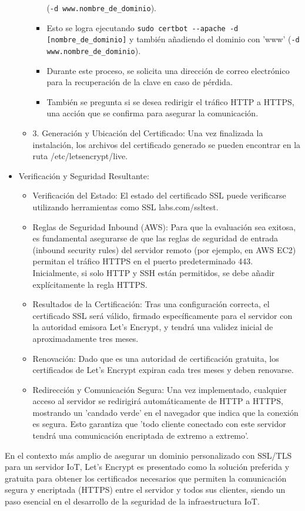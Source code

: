 \documentclass{report}
\begin{document}
\begin{itemize}
\begin{itemize}
\begin{itemize}
                    (\verb|-d www.nombre_de_dominio|).
                    \item Esto se logra ejecutando \verb|sudo certbot --apache -d [nombre_de_dominio]| y también añadiendo el dominio con 'www' 
                    (\verb|-d www.nombre_de_dominio|).
                    \item Durante este proceso, se solicita una dirección de correo electrónico para la recuperación de la clave en caso de pérdida.
                    \item También se pregunta si se desea redirigir el tráfico HTTP a HTTPS, una acción que se confirma para asegurar la comunicación.
                \end{itemize}
            \item 3. Generación y Ubicación del Certificado: Una vez finalizada la instalación, los archivos del certificado generado 
            se pueden encontrar en la ruta /etc/letsencrypt/live.
        \end{itemize}
    \item Verificación y Seguridad Resultante:
        \begin{itemize}
            \item Verificación del Estado: El estado del certificado SSL puede verificarse utilizando herramientas como SSL labs.com/ssltest.
            \item Reglas de Seguridad Inbound (AWS): Para que la evaluación sea exitosa, es fundamental asegurarse de que las reglas de 
            seguridad de entrada (inbound security rules) del servidor remoto (por ejemplo, en AWS EC2) permitan el tráfico HTTPS en el puerto 
            predeterminado 443. Inicialmente, si solo HTTP y SSH están permitidos, se debe añadir explícitamente la regla HTTPS.
            \item Resultados de la Certificación: Tras una configuración correcta, el certificado SSL será válido, firmado específicamente 
            para el servidor con la autoridad emisora Let's Encrypt, y tendrá una validez inicial de aproximadamente tres meses.
            \item Renovación: Dado que es una autoridad de certificación gratuita, los certificados de Let's Encrypt expiran cada tres meses 
            y deben renovarse.
            \item Redirección y Comunicación Segura: Una vez implementado, cualquier acceso al servidor se redirigirá automáticamente de 
            HTTP a HTTPS, mostrando un 'candado verde' en el navegador que indica que la conexión es segura. Esto garantiza que 'todo cliente 
            conectado con este servidor tendrá una comunicación encriptada de extremo a extremo'.
        \end{itemize}
\end{itemize}
En el contexto más amplio de asegurar un dominio personalizado con SSL/TLS para un servidor IoT, Let's Encrypt es presentado como 
la solución preferida y gratuita para obtener los certificados necesarios que permiten la comunicación segura y encriptada (HTTPS) 
entre el servidor y todos sus clientes, siendo un paso esencial en el desarrollo de la seguridad de la infraestructura IoT.
\end{document}
